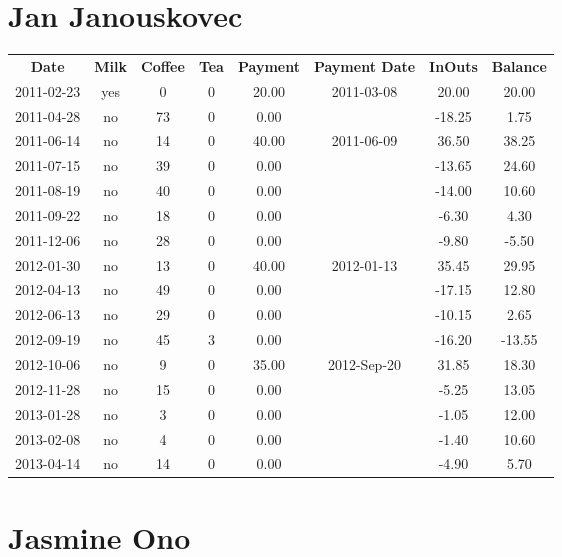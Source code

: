 \section{Jan Janouskovec}

\begin{center}
\begin{tabular}{cccccccc}
\textbf{Date} & \textbf{Milk} & \textbf{Coffee} & \textbf{Tea} & \textbf{Payment} & \textbf{Payment Date} & \textbf{InOuts} & \textbf{Balance} \\
2011-02-23 & yes &  0 & 0 & 20.00 & 2011-03-08 &  20.00 &  20.00\\ 
2011-04-28 & no & 73 & 0 &  0.00 &  & -18.25 &   1.75\\ 
2011-06-14 & no & 14 & 0 & 40.00 & 2011-06-09 &  36.50 &  38.25\\ 
2011-07-15 & no & 39 & 0 &  0.00 &  & -13.65 &  24.60\\ 
2011-08-19 & no & 40 & 0 &  0.00 &  & -14.00 &  10.60\\ 
2011-09-22 & no & 18 & 0 &  0.00 &  &  -6.30 &   4.30\\ 
2011-12-06 & no & 28 & 0 &  0.00 &  &  -9.80 &  -5.50\\ 
2012-01-30 & no & 13 & 0 & 40.00 & 2012-01-13 &  35.45 &  29.95\\ 
2012-04-13 & no & 49 & 0 &  0.00 &  & -17.15 &  12.80\\ 
2012-06-13 & no & 29 & 0 &  0.00 &  & -10.15 &   2.65\\ 
2012-09-19 & no & 45 & 3 &  0.00 &  & -16.20 & -13.55\\ 
2012-10-06 & no &  9 & 0 & 35.00 & 2012-Sep-20 &  31.85 &  18.30\\ 
2012-11-28 & no & 15 & 0 &  0.00 &  &  -5.25 &  13.05\\ 
2013-01-28 & no &  3 & 0 &  0.00 &  &  -1.05 &  12.00\\ 
2013-02-08 & no &  4 & 0 &  0.00 &  &  -1.40 &  10.60\\ 
2013-04-14 & no & 14 & 0 &  0.00 &  &  -4.90 &   5.70
\end{tabular}
\end{center}

\section{Jasmine Ono}

